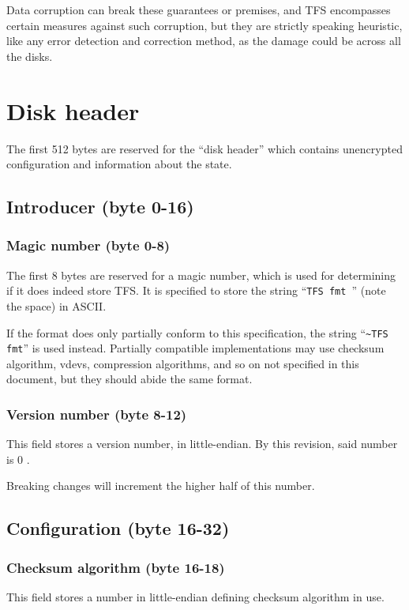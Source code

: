 \documentclass[11pt,a4paper]{report}
\newcommand{\clustersize}{512 }
\newcommand{\versionnumber}{0 }
\begin{document}
        Data corruption can break these guarantees or premises, and TFS
        encompasses certain measures against such corruption, but they are
        strictly speaking heuristic, like any error detection and correction
        method, as the damage could be across all the disks.

    \chapter{Disk header}
    \label{header}
    The first \clustersize bytes are reserved for the ``disk header'' which
    contains unencrypted configuration and information about the state.

    \section{Introducer (byte 0-16)}
        \subsection{Magic number (byte 0-8)}
        The first 8 bytes are reserved for a magic number, which is used for
        determining if it does indeed store TFS\@. It is specified to store the
        string ``\texttt{TFS fmt }'' (note the space) in ASCII.

        If the format does only partially conform to this specification, the
        string ``\texttt{\textasciitilde TFS fmt}'' is used instead. Partially
        compatible implementations may use checksum algorithm, vdevs,
        compression algorithms, and so on not specified in this document, but
        they should abide the same format.

        \subsection{Version number (byte 8-12)}
        \label{header:versionnumber}
        This field stores a version number, in little-endian. By this revision,
        said number is \versionnumber.

        Breaking changes will increment the higher half of this number.

    \section{Configuration (byte 16-32)}
        \subsection{Checksum algorithm (byte 16-18)}
        \label{config:checksum}
        This field stores a number in little-endian defining checksum algorithm
        in use.
\end{document}
